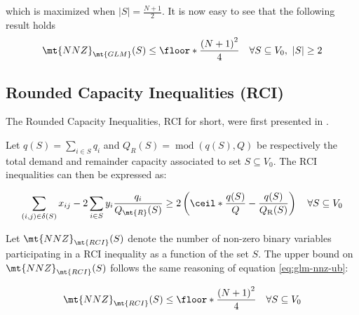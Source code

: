 which is maximized when $|S| = \frac{N+1}{2}$.
It is now easy to see that the following result holds
\begin{equation}\label{eq:glm-nnz-ub}
	\mt{NNZ}_{\mt{GLM}}(S) \le \floor*{ \frac{\left( N + 1 \right)^2}{4}} \quad \forall S \subseteq V_0,\ |S| \ge 2
\end{equation}


\subsection{Rounded Capacity Inequalities (RCI)}
The Rounded Capacity Inequalities, RCI for short, were first presented in \cite{achuthan_capacitated_1998}.

Let $q(S) = \sum_{i \in S} q_i$ and $Q_{R}(S) = \mathop{mod}\left(q(S), Q \right)$ be respectively the total demand and remainder capacity associated to set $S \subseteq V_0$.
The RCI inequalities can then be expressed as:

\begin{equation}\label{eq:rci-inequality}
	\begin{split}
		\sum_{(i, j) \in \delta(S)} x_{ij} -2 \sum_{i \in S} y_i {\frac{q_i}{Q_\mt{R}(S)}}    \ge   2 \left( \ceil*{ \frac{q(S)}{Q}} - \frac{q(S)}{Q_{\mathrm{R}}(S)} \right) \quad \forall S \subseteq V_0
	\end{split}
\end{equation}

Let $\mt{NNZ}_{\mt{RCI}}(S)$ denote the number of non-zero binary variables participating in a RCI inequality as a function of the set $S$.
The upper bound on $\mt{NNZ}_{\mt{RCI}}(S)$ follows the same reasoning of equation \eqref{eq:glm-nnz-ub}:

\begin{equation}\label{eq:rc-nnz-ub}
	\mt{NNZ}_{\mt{RCI}}(S) \le \floor*{\frac{\left( N + 1\right)^2}{4}} \quad \forall S \subseteq V_0
\end{equation}
